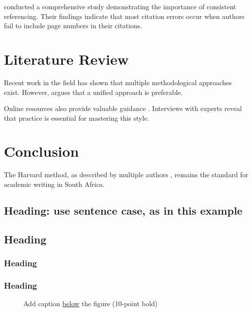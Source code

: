\textcite{henderson-etal-1987} conducted a comprehensive study demonstrating 
the importance of consistent referencing. Their findings \parencite[67]{henderson-etal-1987} 
indicate that most citation errors occur when authors fail to include page 
numbers in their citations.

\section{Literature Review}

Recent work in the field \parencite{oliver-2006,delacalle-rodriguez-2021} has shown that 
multiple methodological approaches exist. However, \textcite{dalicuba-2020} 
argues that a unified approach is preferable.

Online resources also provide valuable guidance \parencite{kabaso-krishanth}. 
Interviews with experts \parencite{hendricks-waldon} reveal that practice is 
essential for mastering this style.

\section{Conclusion}

The Harvard method, as described by multiple authors \parencite{kioko-etal-2003,
	ellis-peters-2000,henderson-etal-1987}, remains the standard for academic 
writing in South Africa.

\subsection{Heading: use sentence case, as in this example}

\subsection{Heading}

\subsubsection{Heading}

\subsubsection{Heading}

\begin{figure}[htbp]
\centering
\caption{Add caption \underline{below} the figure (10-point bold)}
\label{fig:1.1}
\end{figure}

